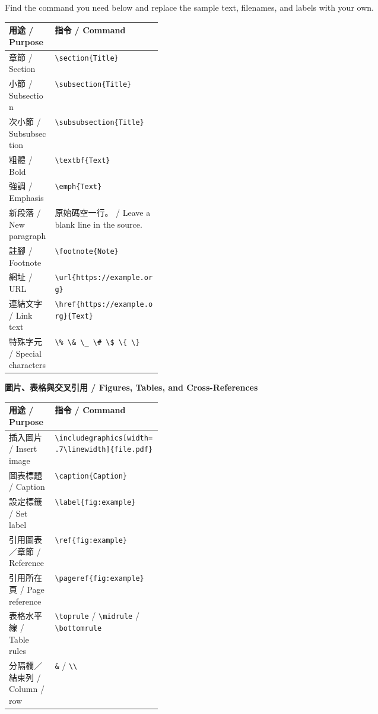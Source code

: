 \documentclass[11pt,a4paper]{article}
\begin{document}
Find the command you need below and replace the sample text, filenames, and labels with your own.

\begingroup
\small
\setlength{\tabcolsep}{4pt}
\renewcommand{\arraystretch}{1.35}
\noindent\begin{tabularx}{\linewidth}{@{}>{\raggedright\arraybackslash}p{0.30\linewidth}X@{}}
\toprule
用途 / Purpose & 指令 / Command \\
\midrule
章節 / Section & \texttt{\textbackslash{}section\{Title\}} \\
小節 / Subsection & \texttt{\textbackslash{}subsection\{Title\}} \\
次小節 / Subsubsection & \texttt{\textbackslash{}subsubsection\{Title\}} \\
粗體 / Bold & \texttt{\textbackslash{}textbf\{Text\}} \\
強調 / Emphasis & \texttt{\textbackslash{}emph\{Text\}} \\
新段落 / New paragraph & 原始碼空一行。 / Leave a blank line in the source. \\
註腳 / Footnote & \texttt{\textbackslash{}footnote\{Note\}} \\
網址 / URL & \texttt{\textbackslash{}url\{https://example.org\}} \\
連結文字 / Link text & \texttt{\textbackslash{}href\{https://example.org\}\{Text\}} \\
特殊字元 / Special characters & \texttt{\textbackslash\%\ \textbackslash\&\ \textbackslash\_\ \textbackslash\#\ \textbackslash\$\ \textbackslash\{\ \textbackslash\}} \\
\bottomrule
\end{tabularx}

\medskip
\noindent\textbf{圖片、表格與交叉引用 / Figures, Tables, and Cross-References}

\noindent\begin{tabularx}{\linewidth}{@{}>{\raggedright\arraybackslash}p{0.30\linewidth}X@{}}
\toprule
用途 / Purpose & 指令 / Command \\
\midrule
插入圖片 / Insert image & \texttt{\textbackslash{}includegraphics[width=.7\textbackslash{}linewidth]\{file.pdf\}} \\
圖表標題 / Caption & \texttt{\textbackslash{}caption\{Caption\}} \\
設定標籤 / Set label & \texttt{\textbackslash{}label\{fig:example\}} \\
引用圖表／章節 / Reference & \texttt{\textbackslash{}ref\{fig:example\}} \\
引用所在頁 / Page reference & \texttt{\textbackslash{}pageref\{fig:example\}} \\
表格水平線 / Table rules & \texttt{\textbackslash{}toprule} / \texttt{\textbackslash{}midrule} / \texttt{\textbackslash{}bottomrule} \\
分隔欄／結束列 / Column / row & \texttt{\&} / \texttt{\textbackslash{}\textbackslash{}} \\
\bottomrule
\end{tabularx}
\end{document}
